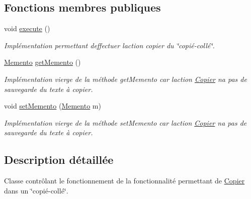 \subsection*{Fonctions membres publiques}
\begin{DoxyCompactItemize}
\item 
void \hyperlink{classfr_1_1istic_1_1m1_1_1aco_1_1miniediteur_1_1v1_1_1Copier_ac0a36f63af9a9c11bdc4c043923ded58}{execute} ()
\begin{DoxyCompactList}\small\item\em Implémentation permettant d\textquotesingle{}effectuer l\textquotesingle{}action copier du \char`\"{}copié-\/collé\char`\"{}. \end{DoxyCompactList}\item 
\hyperlink{interfacefr_1_1istic_1_1m1_1_1aco_1_1miniediteur_1_1v1_1_1Memento}{Memento} \hyperlink{classfr_1_1istic_1_1m1_1_1aco_1_1miniediteur_1_1v1_1_1Copier_af7810fb486b49fcf6ca28958de33c7d0}{get\+Memento} ()
\begin{DoxyCompactList}\small\item\em Implémentation vierge de la méthode get\+Memento car l\textquotesingle{}action \hyperlink{classfr_1_1istic_1_1m1_1_1aco_1_1miniediteur_1_1v1_1_1Copier}{Copier} n\textquotesingle{}a pas de sauvegarde du texte à copier. \end{DoxyCompactList}\item 
\mbox{\label{classfr_1_1istic_1_1m1_1_1aco_1_1miniediteur_1_1v1_1_1Copier_a4e1de8f07ded1ed4e33d8c8e6385a0a6}} 
void \hyperlink{classfr_1_1istic_1_1m1_1_1aco_1_1miniediteur_1_1v1_1_1Copier_a4e1de8f07ded1ed4e33d8c8e6385a0a6}{set\+Memento} (\hyperlink{interfacefr_1_1istic_1_1m1_1_1aco_1_1miniediteur_1_1v1_1_1Memento}{Memento} m)
\begin{DoxyCompactList}\small\item\em Implémentation vierge de la méthode set\+Memento car l\textquotesingle{}action \hyperlink{classfr_1_1istic_1_1m1_1_1aco_1_1miniediteur_1_1v1_1_1Copier}{Copier} n\textquotesingle{}a pas de sauvegarde du texte à copier. \end{DoxyCompactList}\end{DoxyCompactItemize}


\subsection{Description détaillée}
Classe contrôlant le fonctionnement de la fonctionnalité permettant de \hyperlink{classfr_1_1istic_1_1m1_1_1aco_1_1miniediteur_1_1v1_1_1Copier}{Copier} dans un \char`\"{}copié-\/collé\char`\"{}. 

